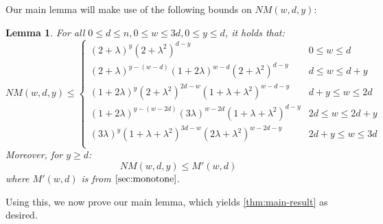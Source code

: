 \documentclass[10pt,a4paper]{article}
\newtheorem{lemma}{Lemma}
\newcommand{\openinteger}{y}
\begin{document}
Our main lemma will make use of the following bounds on $NM(w, d, \openinteger)$:

\begin{lemma} 
\label{lem:NMwdo}
For all $0\le d\le n, 0\le w\le 3d, 0\le \openinteger\le d$, it holds that:
\[
NM(w,d,\openinteger) \le
\begin{cases}
(2+\lambda)^{\openinteger}(2+\lambda^2)^{d-\openinteger}
 & 0\le w \le d\\
(2+\lambda)^{\openinteger - (w-d)}(1+2\lambda)^{w-d}(2+\lambda^2)^{d-\openinteger}
 & d\le w \le d + \openinteger\\
(1+2\lambda)^{\openinteger}(2+\lambda^2)^{2d-w}(1+\lambda+\lambda^2)^{w-d-\openinteger}
& d+\openinteger\le w\le 2d\\
(1+2\lambda)^{\openinteger - (w-2d)}(3\lambda)^{w-2d}(1+\lambda+\lambda^2)^{d-\openinteger}
& 2d\le w\le 2d+\openinteger\\
(3\lambda)^{\openinteger}(1+\lambda+\lambda^2)^{3d-w}(2\lambda + \lambda^2)^{w-2d-\openinteger}
& 2d+\openinteger\le w\le 3d\\
\end{cases}
\]
Moreover, for $\openinteger \ge d$:
\[
   NM(w, d, \openinteger) \le M'(w, d)
\]
where $M'(w, d)$ is from $\cref{sec:monotone}$.
\end{lemma}


Using this, we now prove our main lemma, which yields \cref{thm:main-result} as desired.
\end{document}
